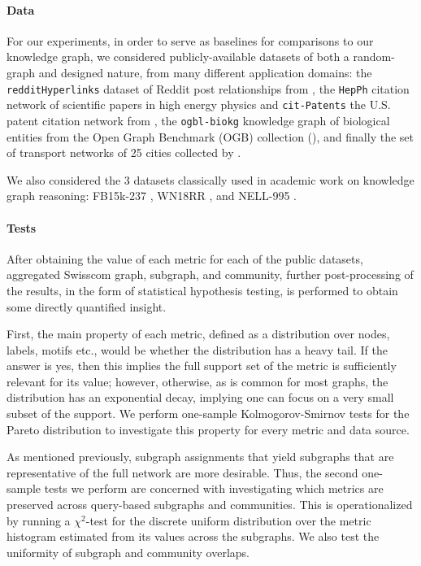 \paragraph{Data} For our experiments, in order to serve as baselines for comparisons to our knowledge graph, we considered publicly-available datasets of both a random-graph and designed nature, from many different application domains: the \texttt{redditHyperlinks} dataset of Reddit post relationships from \cite{kumar_community_2018}, the \texttt{HepPh} citation network of scientific papers in high energy physics and \texttt{cit-Patents} the U.S. patent citation network from \cite{leskovec_graphs_2005}, the \texttt{ogbl-biokg} knowledge graph of biological entities from the Open Graph Benchmark (OGB) collection (\cite{hu_open_2021}), and finally the set of transport networks of 25 cities collected by \cite{kujala_collection_2018}.

We also considered the 3 datasets classically used in academic work on knowledge graph reasoning: FB15k-237 \cite{toutanova_observed_2015}, WN18RR \cite{dettmers_convolutional_2018}, and NELL-995 \cite{xiong_deeppath_2017}.

\paragraph{Tests} After obtaining the value of each metric for each of the public datasets, aggregated Swisscom graph, subgraph, and community, further post-processing of the results, in the form of statistical hypothesis testing, is performed to obtain some directly quantified insight.

First, the main property of each metric, defined as a distribution over nodes, labels, motifs etc., would be whether the distribution has a heavy tail. If the answer is yes, then this implies the full support set of the metric is sufficiently relevant for its value; however, otherwise, as is common for most graphs, the distribution has an exponential decay, implying one can focus on a very small subset of the support. We perform one-sample Kolmogorov-Smirnov tests for the Pareto distribution to investigate this property for every metric and data source.

As mentioned previously, subgraph assignments that yield subgraphs that are representative of the full network are more desirable. Thus, the second one-sample tests we perform are concerned with investigating which metrics are preserved across query-based subgraphs and communities. This is operationalized by running a $\chi^2$-test for the discrete uniform distribution over the metric histogram estimated from its values across the subgraphs. We also test the uniformity of subgraph and community overlaps.

